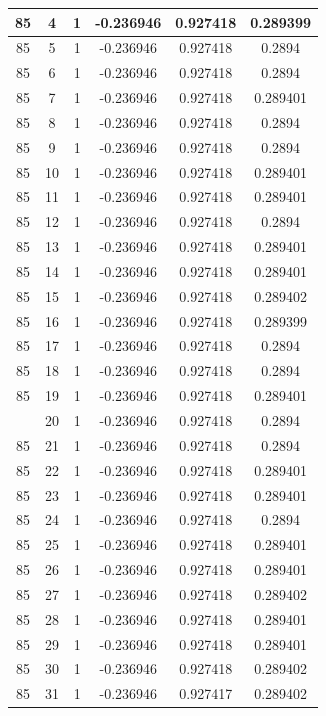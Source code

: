 \documentclass[12pt,a4paper]{article}
\numberwithin{equation}{section}
\numberwithin{figure}{section}
\numberwithin{table}{section}
\begin{document}
\begin{longtable}{|c|c|c|c|c|c|}
85 & 4 & 1 & -0.236946 & 0.927418 & 0.289399 \\ \hline
85 & 5 & 1 & -0.236946 & 0.927418 & 0.2894 \\ \hline
85 & 6 & 1 & -0.236946 & 0.927418 & 0.2894 \\ \hline
85 & 7 & 1 & -0.236946 & 0.927418 & 0.289401 \\ \hline
85 & 8 & 1 & -0.236946 & 0.927418 & 0.2894 \\ \hline
85 & 9 & 1 & -0.236946 & 0.927418 & 0.2894 \\ \hline
85 & 10 & 1 & -0.236946 & 0.927418 & 0.289401 \\ \hline
85 & 11 & 1 & -0.236946 & 0.927418 & 0.289401 \\ \hline
85 & 12 & 1 & -0.236946 & 0.927418 & 0.2894 \\ \hline
85 & 13 & 1 & -0.236946 & 0.927418 & 0.289401 \\ \hline
85 & 14 & 1 & -0.236946 & 0.927418 & 0.289401 \\ \hline
85 & 15 & 1 & -0.236946 & 0.927418 & 0.289402 \\ \hline
85 & 16 & 1 & -0.236946 & 0.927418 & 0.289399 \\ \hline
85 & 17 & 1 & -0.236946 & 0.927418 & 0.2894 \\ \hline
85 & 18 & 1 & -0.236946 & 0.927418 & 0.2894 \\ \hline
85 & 19 & 1 & -0.236946 & 0.927418 & 0.289401 \\ \hline
\pagebreak
85 & 20 & 1 & -0.236946 & 0.927418 & 0.2894 \\ \hline
85 & 21 & 1 & -0.236946 & 0.927418 & 0.2894 \\ \hline
85 & 22 & 1 & -0.236946 & 0.927418 & 0.289401 \\ \hline
85 & 23 & 1 & -0.236946 & 0.927418 & 0.289401 \\ \hline
85 & 24 & 1 & -0.236946 & 0.927418 & 0.2894 \\ \hline
85 & 25 & 1 & -0.236946 & 0.927418 & 0.289401 \\ \hline
85 & 26 & 1 & -0.236946 & 0.927418 & 0.289401 \\ \hline
85 & 27 & 1 & -0.236946 & 0.927418 & 0.289402 \\ \hline
85 & 28 & 1 & -0.236946 & 0.927418 & 0.289401 \\ \hline
85 & 29 & 1 & -0.236946 & 0.927418 & 0.289401 \\ \hline
85 & 30 & 1 & -0.236946 & 0.927418 & 0.289402 \\ \hline
85 & 31 & 1 & -0.236946 & 0.927417 & 0.289402 \\ \hline

\end{longtable}
\end{document}
